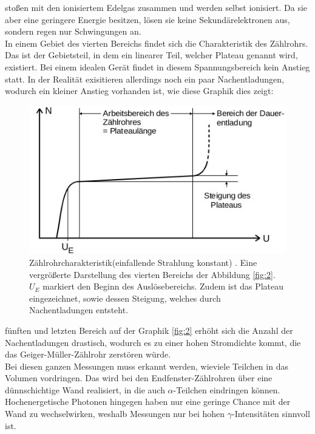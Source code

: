 stoßen mit den ionisiertem Edelgas zusammen und werden selbst ionisiert.
Da sie aber eine geringere Energie besitzen, lösen sie keine Sekundärelektronen aus,
sondern regen nur Schwingungen an.\\
In einem Gebiet des vierten Bereichs findet sich die Charakteristik des Zählrohrs.
Das ist der Gebietsteil, in dem ein linearer Teil, welcher Plateau genannt wird, existiert.
Bei einem idealen Gerät findet in diesem Spannungsbereich kein Anstieg statt.
In der Realität exisitieren allerdings noch ein paar Nachentladungen, wodurch ein kleiner 
Anstieg vorhanden ist, wie diese Graphik dies zeigt: 
\begin{figure}[H]
    \centering
    \includegraphics[width=0.7\linewidth]{images/plateau.jpg}
    \caption{Zählrohrcharakteristik(einfallende Strahlung konstant) \cite{V703}.
    Eine vergrößerte Darstellung des vierten Bereichs der Abbildung \ref{fig:2}.
    $U_E$ markiert den Beginn des Auslösebereichs. Zudem ist das Plateau 
    eingezeichnet, sowie dessen Steigung, welches durch Nachentladungen
    entsteht.
    }
    \label{fig:4}
\end{figure}
\justifying fünften und letzten Bereich auf der Graphik \ref{fig:2}
erhöht sich die Anzahl der Nachentladungen drastisch, wodurch es zu einer hohen
Stromdichte kommt, die das Geiger-Müller-Zählrohr zerstören würde.\\
Bei diesen ganzen Messungen muss erkannt werden, wieviele Teilchen in das Volumen vordringen.
Das wird bei den Endfenster-Zählrohren über eine dünnschichtige Wand realisiert, in die
auch $\alpha$-Teilchen eindringen können. Hochenergetische Photonen hingegen haben nur eine 
geringe Chance mit der Wand zu wechselwirken, weshalb Messungen nur bei hohen $\gamma$-Intensitäten
sinnvoll ist.


